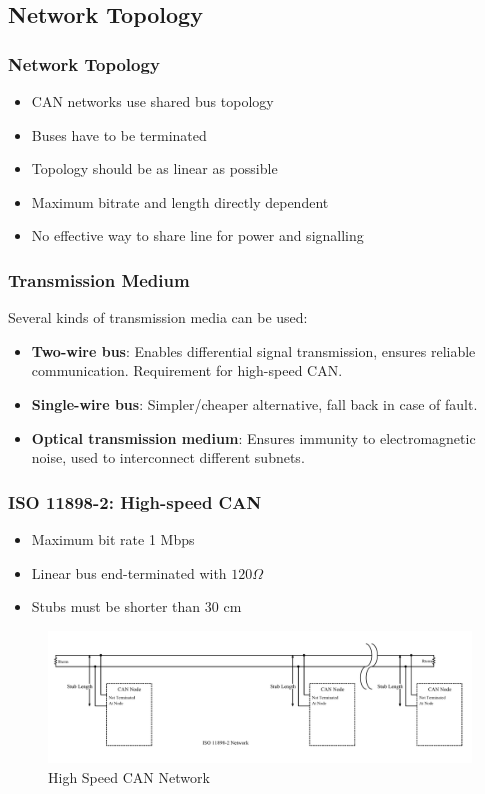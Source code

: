 \documentclass{beamer}
\begin{document}
\subsection{Network Topology}
\begin{frame}
	\frametitle{Network Topology}
	\begin{itemize}
		\item CAN networks use shared bus topology
		\item Buses have to be terminated
		\item Topology should be as linear as possible
		\item Maximum bitrate and length directly dependent
		\item No effective way to share line for power and signalling
	\end{itemize}
\end{frame}

\begin{frame}
	\frametitle{Transmission Medium}
	Several kinds of transmission media can be used:
	\begin{itemize}
		\item \textbf{Two-wire bus}: Enables differential signal transmission, ensures reliable communication. Requirement for high-speed CAN.
		\item \textbf{Single-wire bus}: Simpler/cheaper alternative, fall back in case of fault.
		\item \textbf{Optical transmission medium}: Ensures immunity to electromagnetic noise, used to interconnect different subnets.
	\end{itemize}
\end{frame}

\begin{frame}
	\frametitle{ISO 11898-2: High-speed CAN}
	\begin{itemize}
		\item Maximum bit rate 1 Mbps
		\item Linear bus end-terminated with $120 \Omega$
		\item Stubs must be shorter than 30 cm
	\end{itemize}
	\begin{figure}
\includegraphics[width=.75\textwidth]{highspeed.png} 
\caption{High Speed CAN Network}%
\end{figure}
\end{frame}
\end{document}
